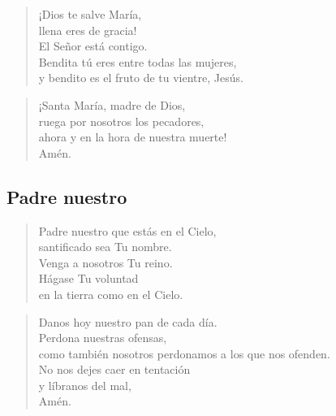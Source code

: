 \documentclass[spanish,utf8,twocolumn]{chlart}
\newenvironment{uno}{%
	\begin{verse}\color{lector}}{\end{verse}}
\newenvironment{todos}{%
	\begin{verse}\color{responden}}{\end{verse}}
\begin{document}
\begin{uno}
¡Dios te salve María,\\llena eres de gracia!\\
El Señor está contigo.\\
Bendita tú eres entre todas las mujeres,\\
y bendito es el fruto de tu vientre, Jesús.
\end{uno}

\begin{todos}
¡Santa María, madre de Dios,\\
ruega por nosotros los pecadores,\\
ahora y en la hora de nuestra muerte!\\
Amén.
\end{todos}

\subsection*{Padre nuestro}

\begin{uno}
Padre nuestro que estás en el Cielo,\\
santificado sea Tu nombre.\\
Venga a nosotros Tu reino.\\
Hágase Tu voluntad\\
en la tierra como en el Cielo.
\end{uno}

\begin{todos}
Danos hoy nuestro pan de cada día.\\
Perdona nuestras ofensas,\\
como también nosotros perdonamos a los que nos ofenden.\\
No nos dejes caer en tentación\\
y líbranos del mal,\\
Amén.
\end{todos}
\end{document}
